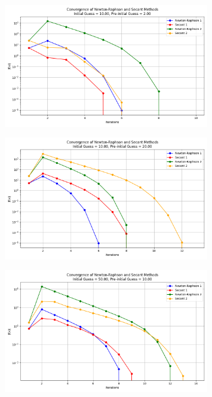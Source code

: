 \documentclass[12pt, a4paper]{article} %
\begin{document}
        \begin{figure}[H]
            \centering
            \includegraphics[width=0.8\textwidth]{../images/convergence-initial-100-preinitial-20.png}
            \caption{}        
        \end{figure}


        \begin{figure}[H]
            \centering
            \includegraphics[width=0.8\textwidth]{../images/convergence-initial-100-preinitial-200.png}                
            \caption{}       
        \end{figure}

        \begin{figure}[H]
            \centering
            \includegraphics[width=0.8\textwidth]{../images/convergence-initial-500-preinitial-100.png}
            \caption{}        
        \end{figure}
\end{document}
